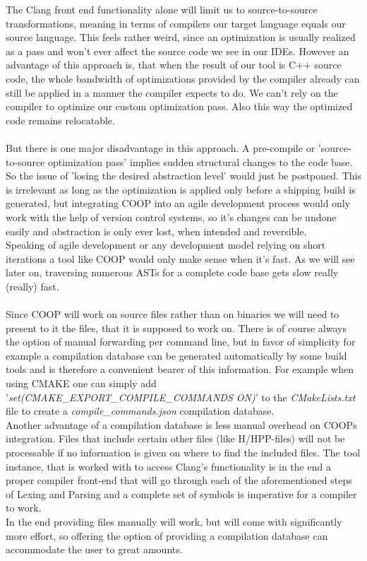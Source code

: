 The Clang front end functionality alone will limit us to source-to-source transformations, meaning in terms of compilers our target language equals our source language. This feels rather weird, since an optimization is usually realized as a pass and won't ever affect the source code we see in our IDEs. However an advantage of this approach is, that when the result of our tool is C++ source code, the whole bandwidth of optimizations provided by the compiler already can still be applied in a manner the compiler expects to do. We can't rely on the compiler to optimize our custom optimization pass. Also this way the optimized code remains relocatable.\\\\
But there is one major disadvantage in this approach. A pre-compile or 'source-to-source optimization pass' implies sudden structural changes to the code base. So the issue of 'losing the desired abstraction level' would just be postponed. This is irrelevant as long as the optimization is applied only before a shipping build is generated, but integrating COOP into an agile development process would only work with the help of version control systems, so it's changes can be undone easily and abstraction is only ever lost, when intended and reversible.\\
Speaking of agile development or any development model relying on short iterations a tool like COOP would only make sense when it's fast. As we will see later on, traversing numerous ASTs for a complete code base gets slow really (really) fast.\\\\
Since COOP will work on source files rather than on binaries we will need to present to it the files, that it is supposed to work on. There is of course always the option of manual forwarding per command line, but in favor of simplicity for example a compilation database can be generated automatically by some build tools and is therefore a convenient bearer of this information. For example when using CMAKE one can simply add '\textit{set(CMAKE\_EXPORT\_COMPILE\_COMMANDS ON)}' to the \textit{CMakeLists.txt} file to create a \textit{compile\_commands.json} compilation database.\\
Another advantage of a compilation database is less manual overhead on COOPs integration. Files that include certain other files (like H/HPP-files) will not be processable if no information is given on where to find the included files. The tool instance, that is worked with to access Clang's functionality is in the end a proper compiler front-end that will go through each of the aforementioned steps of Lexing and Parsing and a complete set of symbols is imperative for a compiler to work.\\
In the end providing files manually will work, but will come with significantly more effort, so offering the option of providing a compilation database can accommodate the user to great amounts.

